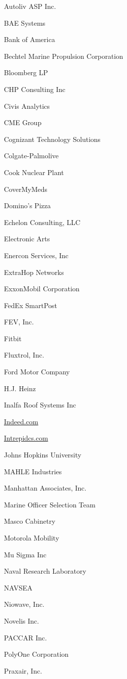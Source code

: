 \documentclass[twoside]{article}
\begin{document}
\begin{center}
\begin{multicols}{5}
\begin{FlushLeft}
\begin{compactitem}
\item Autoliv ASP Inc.
\item BAE Systems
\item Bank of America
\item Bechtel Marine Propulsion Corporation
\item Bloomberg LP
\item CHP Consulting Inc
\item Civis Analytics
\item CME Group
\item Cognizant Technology Solutions
\item Colgate-Palmolive
\item Cook Nuclear Plant
\item CoverMyMeds
\item Domino's Pizza
\item Echelon Consulting, LLC
\item Electronic Arts
\item Enercon Services, Inc
\item ExtraHop Networks
\item ExxonMobil Corporation
\item FedEx SmartPost
\item FEV, Inc.
\item Fitbit
\item Fluxtrol, Inc.
\item Ford Motor Company
\item H.J. Heinz
\item Inalfa Roof Systems Inc
\item \url{Indeed.com}
\item \url{Intrepidcs.com}
\item Johns Hopkins University
\item MAHLE Industries
\item Manhattan Associates, Inc.
\item Marine Officer Selection Team
\item Masco Cabinetry
\item Motorola Mobility
\item Mu Sigma Inc
\item Naval Research Laboratory
\item NAVSEA
\item Niowave, Inc.
\item Novelis Inc.
\item PACCAR Inc.
\item PolyOne Corporation
\item Praxair, Inc.

\end{compactitem}
\end{FlushLeft}
\end{multicols}
\end{center}
\end{document}
